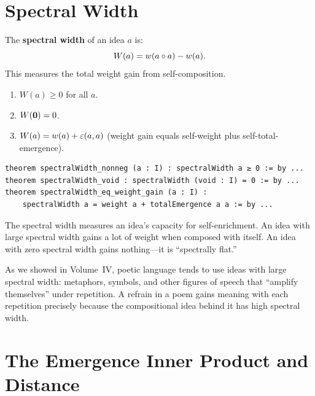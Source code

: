 \section{Spectral Width}

\begin{definition}
\label{def:spectral-width}
The \textbf{spectral width} of an idea $a$ is:
\[
  W(a) = w(a \circ a) - w(a).
\]
This measures the total weight gain from self-composition.
\end{definition}

\begin{theorem}
\label{thm:spectral-width-properties}
\begin{enumerate}
  \item $W(a) \geq 0$ for all $a$.
  \item $W(\mathbf{0}) = 0$.
  \item $W(a) = w(a) + \varepsilon(a,a)$ (weight gain equals self-weight plus
    self-total-emergence).
\end{enumerate}
\end{theorem}

\begin{lstlisting}[caption={Spectral width (IDT\_v3\_Emergence.lean)}]
theorem spectralWidth_nonneg (a : I) : spectralWidth a ≥ 0 := by ...
theorem spectralWidth_void : spectralWidth (void : I) = 0 := by ...
theorem spectralWidth_eq_weight_gain (a : I) :
    spectralWidth a = weight a + totalEmergence a a := by ...
\end{lstlisting}

\begin{interpretation}
The spectral width measures an idea's capacity for self-enrichment. An idea
with large spectral width gains a lot of weight when composed with itself.
An idea with zero spectral width gains nothing---it is ``spectrally flat.''

As we showed in Volume~IV, poetic language tends to use ideas with large spectral
width: metaphors, symbols, and other figures of speech that ``amplify themselves''
under repetition. A refrain in a poem gains meaning with each repetition
precisely because the compositional idea behind it has high spectral width.
\end{interpretation}


\section{The Emergence Inner Product and Distance}

